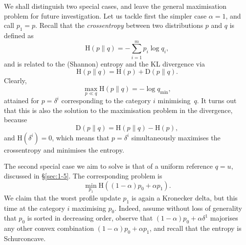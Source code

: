 We shall distinguish two special cases, and leave the general maximisation problem for future investigation. Let us tackle first the simpler case $\alpha=1$, and call $p_1=p$. Recall that the \emph{cross\hyph entropy} between two distributions $p$ and $q$ is defined as
\begin{equation*}
\mathrm{H}(p\|q)=-\sum_{i=1}^m p_i\log q_i,
\end{equation*}
and is related to the (Shannon) entropy and the KL divergence via
\begin{equation*}
\mathrm{H}(p\|q)=\mathrm{H}(p)+\mathrm{D}(p\|q).
\end{equation*}
Clearly,
\begin{equation*}
\max_{p\ll q} \mathrm{H}(p\|q)=-\log q_\text{min},
\end{equation*}
attained for $p=\delta^i$ corresponding to the category $i$ minimising~$q$. It turns out that this is also the solution to the maximisation problem in the divergence, because 
\begin{equation*}
\mathrm{D}(p\|q)=\mathrm{H}(p\|q)-\mathrm{H}(p),
\end{equation*}
and $\mathrm{H}(\delta^i)=0$, which means that $p=\delta^i$ simultaneously maximises the cross\hyph entropy and minimises the entropy.

The second special case we aim to solve is that of a uniform reference $q=u$, discussed in \S \ref{sec:1-5}. The corresponding problem is
\begin{equation*}
\min_{p_1} \mathrm{H}\left((1-\alpha)p_0+\alpha p_1\right).
\end{equation*}
We claim that the worst profile update $p_1$ is again a Kronecker delta, but this time at the category $i$ maximising $p_0$. Indeed, assume without loss of generality that $p_0$ is sorted in decreasing order, observe that $(1-\alpha)p_0+\alpha\delta^1$ majorises any other convex combination $(1-\alpha)p_0+\alpha p_1$, and recall that the entropy is Schur\hyph concave.

